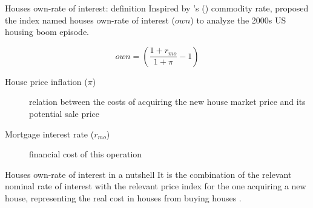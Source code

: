 \documentclass[10pt]{beamer}
\begin{document}
\begin{frame}[label={sec:org07af5d1}]{Houses own-rate of interest: definition}
Inspired by \citeauthor*{sraffaDrHayekMoney1932}'s (\citeyear{sraffaDrHayekMoney1932}) commodity rate, \textcite{teixeira_crescimento_2015}  proposed the index named houses own-rate of interest (\(own\)) to analyze the 2000s US housing boom episode.

\begin{latex}
\begin{equation}
\label{txpropria}
own =  \left(\frac{1+r_{mo}}{1+\pi} - 1\right)
\end{equation}
\end{latex}

\begin{description}
\item[{House price inflation (\(\pi\))}] relation between the costs of acquiring the new house market price and its potential sale price
\item[{Mortgage interest rate (\(r_{mo}\))}] financial cost of this operation
\end{description}

\begin{block}{Houses own-rate of interest in a nutshell}
It is the combination of the relevant nominal rate of interest with the relevant price index for the one acquiring a new house, representing the \alert{real cost in houses from buying houses} \parencite[p.~53]{teixeira_crescimento_2015}.
\end{block}
\end{frame}
\end{document}
